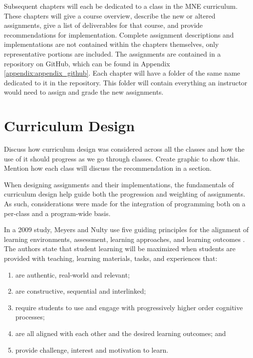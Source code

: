 Subsequent chapters will each be dedicated to a class in the MNE curriculum. These chapters
will give a course overview, describe the new or altered assignments, give a list
of deliverables for that course, and provide recommendations for implementation. Complete 
assignment descriptions and implementations
are not contained within the chapters themselves, only representative portions are included.
The assignments are contained in a repository on GitHub, which can be found in Appendix 
\ref{appendix:appendix_github}. Each chapter will have a folder of the same name dedicated 
to it in the repository. This folder will contain everything an instructor would need to assign 
and grade the new assignments.

\section{Curriculum Design}

Discuss how curriculum design was considered across all the classes and how the use of it
should progress as we go through classes. Create graphic to show this. Mention how each 
class will discuss the recommendation in a section.

When designing assignments and their implementations, the fundamentals of curriculum design
help guide both the progression and weighting of assignments. As such, considerations were
made for the integration of programming both on a per-class and a program-wide basis.

In a 2009 study, Meyers and Nulty use five guiding principles for the alignment of learning
environments, assessment, learning approaches, and learning outcomes \cite{5-cd-principles}.
The authors state that student learning will be maximized when students are provided
with teaching, learning materials, tasks, and experiences that:
\begin{enumerate}
    \item are authentic, real-world and relevant;
    \item are constructive, sequential and interlinked;
    \item require students to use and engage with progressively higher order cognitive 
    processes;
    \item are all aligned with each other and the desired learning outcomes; and
    \item provide challenge, interest and motivation to learn. \cite{5-cd-principles}
\end{enumerate}

